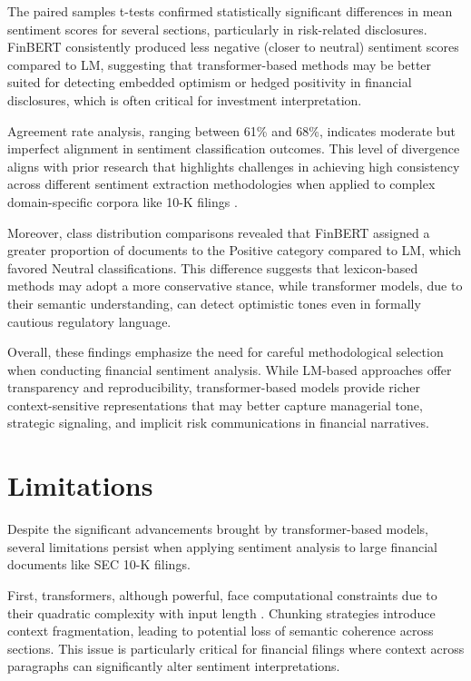 \documentclass[12pt]{article}
\begin{document}
The paired samples t-tests confirmed statistically significant differences in mean sentiment scores for several sections, particularly in risk-related disclosures. FinBERT consistently produced less negative (closer to neutral) sentiment scores compared to LM, suggesting that transformer-based methods may be better suited for detecting embedded optimism or hedged positivity in financial disclosures, which is often critical for investment interpretation.

Agreement rate analysis, ranging between 61\% and 68\%, indicates moderate but imperfect alignment in sentiment classification outcomes. This level of divergence aligns with prior research that highlights challenges in achieving high consistency across different sentiment extraction methodologies when applied to complex domain-specific corpora like 10-K filings \citep{Li2010}.

Moreover, class distribution comparisons revealed that FinBERT assigned a greater proportion of documents to the Positive category compared to LM, which favored Neutral classifications. This difference suggests that lexicon-based methods may adopt a more conservative stance, while transformer models, due to their semantic understanding, can detect optimistic tones even in formally cautious regulatory language.

Overall, these findings emphasize the need for careful methodological selection when conducting financial sentiment analysis. While LM-based approaches offer transparency and reproducibility, transformer-based models provide richer context-sensitive representations that may better capture managerial tone, strategic signaling, and implicit risk communications in financial narratives.

\section{Limitations}
Despite the significant advancements brought by transformer-based models, several limitations persist when applying sentiment analysis to large financial documents like SEC 10-K filings.

First, transformers, although powerful, face computational constraints due to their quadratic complexity with input length \citep{Tay2020}. Chunking strategies introduce context fragmentation, leading to potential loss of semantic coherence across sections. This issue is particularly critical for financial filings where context across paragraphs can significantly alter sentiment interpretations.
\end{document}

